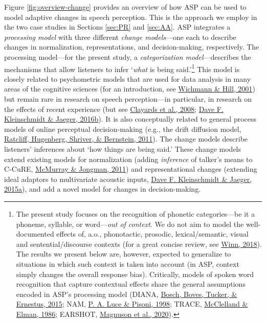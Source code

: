 \documentclass[
  11pt,
  english,
  man,floatsintext]{apa6}
\begin{document}
Figure \ref{fig:overview-change} provides an overview of how ASP can be used to model adaptive changes in speech perception. This is the approach we employ in the two case studies in Sections \ref{sec:PR} and \ref{sec:AA}. ASP integrates a \emph{processing model} with three different \emph{change models}---one each to describe changes in normalization, representations, and decision-making, respectively. The processing model---for the present study, a \emph{categorization model}---describes the mechanisms that allow listeners to infer `\emph{what} is being said.'\footnote{The present study focuses on the recognition of phonetic categories---be it a phoneme, syllable, or word---\emph{out of context}. We do not aim to model the well-documented effects of, a.o., phonotactic, prosodic, lexical/semantic, visual and sentential/discourse contexts (for a great concise review, see \protect\hyperlink{ref-winn2018}{Winn, 2018}). The results we present below are, however, expected to generalize to situations in which such context is taken into account (in ASP, context simply changes the overall response bias). Critically, models of spoken word recognition that capture contextual effects share the general assumptions encoded in ASP's processing model (DIANA, \protect\hyperlink{ref-bosch2015}{Bosch, Boves, Tucker, \& Ernestus, 2015}; NAM, \protect\hyperlink{ref-luce-pisoni1998}{P. A. Luce \& Pisoni, 1998}; TRACE, \protect\hyperlink{ref-mcclelland-elman1986}{McClelland \& Elman, 1986}; EARSHOT, \protect\hyperlink{ref-magnuson2020}{Magnuson et al., 2020}).} This model is closely related to psychometric models that are used for data analysis in many areas of the cognitive sciences (for an introduction, see \protect\hyperlink{ref-wichmann-hill2001}{Wichmann \& Hill, 2001}) but remain rare in research on speech perception---in particular, in research on the effects of recent experience (but see \protect\hyperlink{ref-clayards2008}{Clayards et al., 2008}; \protect\hyperlink{ref-kleinschmidt-jaeger2016cogsci}{Dave F. Kleinschmidt \& Jaeger, 2016b}). It is also conceptually related to general process models of online perceptual decision-making (e.g., the drift diffusion model, \protect\hyperlink{ref-ratcliff2011}{Ratcliff, Hugenberg, Shriver, \& Bernstein, 2011}). The change models describe listeners' inferences about `how things are being said.' These change models extend existing models for normalization (adding \emph{inference} of talker's means to C-CuRE, \protect\hyperlink{ref-mcmurray-jongman2011}{McMurray \& Jongman, 2011}) and representational changes (extending ideal adaptors to multivariate acoustic inputs, \protect\hyperlink{ref-kleinschmidt-jaeger2015}{Dave F. Kleinschmidt \& Jaeger, 2015a}), and add a novel model for changes in decision-making.
\end{document}
